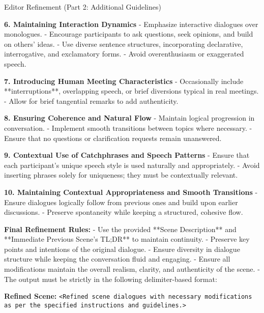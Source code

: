 \begin{figure*}[t]
    \begin{AIbox}{Editor Refinement (Part 2: Additional Guidelines)}
    \parbox[t]{\textwidth} {
        \textbf{6. Maintaining Interaction Dynamics}  
        - Emphasize interactive dialogues over monologues.  
        - Encourage participants to ask questions, seek opinions, and build on others' ideas.  
        - Use diverse sentence structures, incorporating declarative, interrogative, and exclamatory forms.  
        - Avoid overenthusiasm or exaggerated speech.  

        \textbf{7. Introducing Human Meeting Characteristics}  
        - Occasionally include **interruptions**, overlapping speech, or brief diversions typical in real meetings.  
        - Allow for brief tangential remarks to add authenticity.  

        \textbf{8. Ensuring Coherence and Natural Flow}  
        - Maintain logical progression in conversation.  
        - Implement smooth transitions between topics where necessary.  
        - Ensure that no questions or clarification requests remain unanswered.  

        \textbf{9. Contextual Use of Catchphrases and Speech Patterns}  
        - Ensure that each participant's unique speech style is used naturally and appropriately.  
        - Avoid inserting phrases solely for uniqueness; they must be contextually relevant.  

        \textbf{10. Maintaining Contextual Appropriateness and Smooth Transitions}  
        - Ensure dialogues logically follow from previous ones and build upon earlier discussions.  
        - Preserve spontaneity while keeping a structured, cohesive flow.  

        \textbf{Final Refinement Rules:}  
        - Use the provided **Scene Description** and **Immediate Previous Scene's TL;DR** to maintain continuity.  
        - Preserve key points and intentions of the original dialogue.  
        - Ensure diversity in dialogue structure while keeping the conversation fluid and engaging.  
        - Ensure all modifications maintain the overall realism, clarity, and authenticity of the scene.  
        - The output must be strictly in the following delimiter-based format:  
        
        \textbf{Refined Scene:}  
        \texttt{<Refined scene dialogues with necessary modifications as per the specified instructions and guidelines.>}  
    } %
    \end{AIbox}
    \caption{Editor refinement template - Part 2: Additional responsibilities and final rules.}
    \label{fig:editor_refinement_prompt_part2}
\end{figure*}



